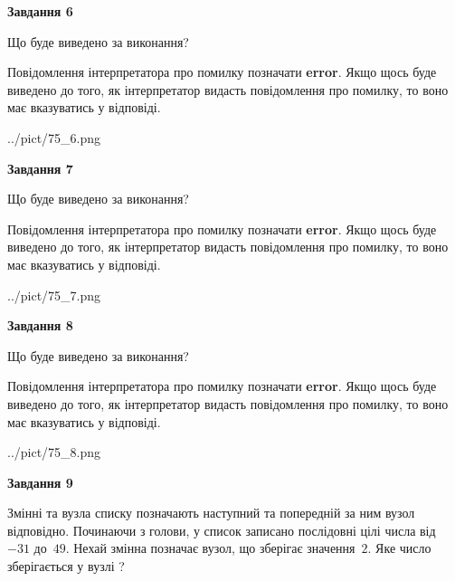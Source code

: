 \documentclass[12pt, ukrainian]{article}
\begin{document}
{\begin {large}
{\begin {center}\textbf{Завдання 6}\end {center}}\par
Що буде виведено за виконання?

Повідомлення інтерпретатора про помилку позначати \textbf{error}.
Якщо щось буде виведено до того, як інтерпретатор видасть повідомлення про помилку, 
то воно має вказуватись у відповіді. \par


\begin{center}
	{../pict/75_6.png}
\end{center}
\newpage

{\begin {center}\textbf{Завдання 7}\end {center}}\par
Що буде виведено за виконання?

Повідомлення інтерпретатора про помилку позначати \textbf{error}.
Якщо щось буде виведено до того, як інтерпретатор видасть повідомлення про помилку, 
то воно має вказуватись у відповіді. \par


\begin{center}
	{../pict/75_7.png}
\end{center}
\newpage

{\begin {center}\textbf{Завдання 8}\end {center}}\par
Що буде виведено за виконання?

Повідомлення інтерпретатора про помилку позначати \textbf{error}.
Якщо щось буде виведено до того, як інтерпретатор видасть повідомлення про помилку, 
то воно має вказуватись у відповіді. \par


\begin{center}
	{../pict/75_8.png}
\end{center}
\newpage

{\begin {center}\textbf{Завдання 9}\end {center}}\par
Змінні  та  вузла списку позначають наступний та попередній за ним вузол відповідно. Починаючи з голови, у список записано послідовні цілі числа від~$-31$ до~$49$. Нехай змінна  позначає вузол, що зберігає значення~$2$.
Яке число зберігається у вузлі  ?\par
\newpage


\end{large}}
\end{document}
